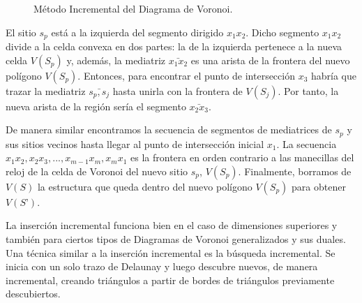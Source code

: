 \begin{figure}[H]
{    }\hspace{0.5cm}
    
    \caption{Método Incremental del Diagrama de Voronoi. } \label{fig:incre}
\end{figure}


El sitio $s_{p}$ está a la izquierda del segmento dirigido $x_{1}x_{2}$.
Dicho segmento $x_{1}x_{2}$ divide a la celda convexa en dos partes: la de la izquierda pertenece a la nueva celda $V(S_{p})$ y, además, la mediatriz $\bar{x_{1}x_{2}}$ es una arista de la frontera del nuevo polígono $V(S_{p})$. Entonces, para encontrar el punto de intersección $x_{3}$ habría que trazar la mediatriz $\bar{s_{p},s_{j}}$ hasta unirla con la frontera de $V(S_{j})$. Por tanto, la nueva arista de la región sería el segmento $\bar{x_{2}x_{3}}$.
\vspace{0.3cm}

De manera similar encontramos la secuencia de segmentos de mediatrices de $s_{p}$ y sus sitios vecinos hasta llegar al punto de intersección inicial $x_{1}$.
La secuencia ${x_{1}x_{2}, x_{2}x_{3}, ... , x_{m-1}x_{m}, x_{m}x_{1}}$ es la frontera en orden contrario a las manecillas del reloj de la celda de Voronoi del nuevo sitio $s_{p}$, $V(S_{p})$.
Finalmente, borramos de $V(S)$ la estructura que queda dentro del nuevo polígono $V(S_{p})$ para obtener $V(S’)$. 
\vspace{0.3cm}

La inserción incremental funciona bien en el caso de dimensiones superiores y también para ciertos tipos de Diagramas de Voronoi generalizados y sus duales. Una técnica similar a la inserción incremental es la búsqueda incremental. Se inicia con un solo trazo de Delaunay y luego descubre nuevos, de manera incremental, creando triángulos a partir de bordes de triángulos previamente descubiertos.


